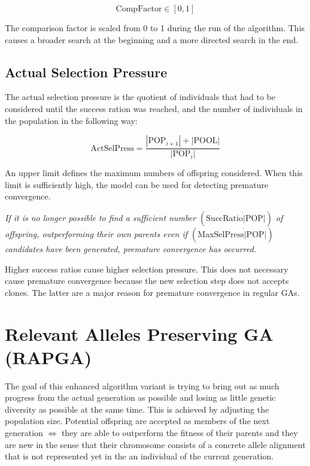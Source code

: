 \documentclass[../main.tex]{subfiles}
\begin{document}
\begin{equation}
    \text{CompFactor} \in [0,1]
\end{equation}

The comparison factor is scaled from 0 to 1 during the run of the algorithm. This causes a broader search at the beginning and a more directed search in the end.

\subsection{Actual Selection Pressure}
The actual selection pressure is the quotient of individuals that had to be considered until the success ration was reached, and the number of individuals in the population in the following way:

\begin{equation}
    \text{ActSelPress} = \frac{ | \text{POP}_{i+1} | + | \text{POOL} | }{ | \text{POP}_i | }
\end{equation}

An upper limit defines the maximum numbers of offspring considered. When this limit is sufficiently high, the model can be used for detecting premature convergence.

\textit{If it is no longer possible to find a sufficient number $(\text{SuccRatio} \dot | \text{POP} |)$ of offspring, outperforming their own parents even if $(\text{MaxSelPress} \dot | \text{POP} |)$ candidates have been generated, premature convergence has occurred.}

Higher success ratios cause higher selection pressure. This does not necessary cause premature convergence because the new selection step does not accepts clones. The latter are a major reason for premature convergence in regular GAs.

\section{Relevant Alleles Preserving GA (RAPGA)}

The goal of this enhanced algorithm variant is trying to bring out as much progress from the actual generation as possible and losing as little genetic diversity as possible at the same time. This is achieved by adjusting the population size. Potential offspring are accepted as members of the next generation $\Leftrightarrow $ they are able to outperform the fitness of their parents and they are new in the sense that their chromosome consists of a concrete allele alignment that is not represented yet in the  an individual of the current generation.
\end{document}
